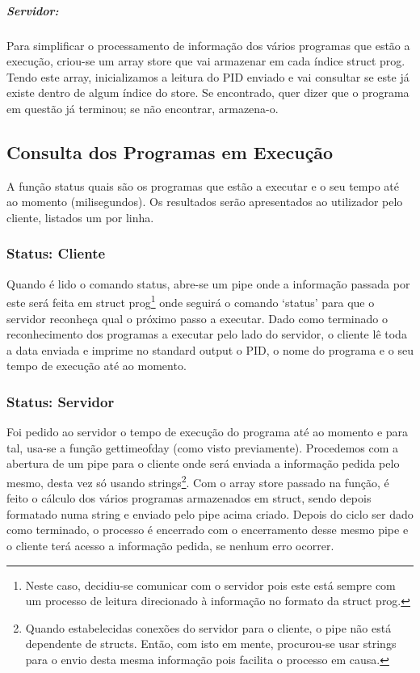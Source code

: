 \documentclass{report}
\begin{document}
\subparagraph{Servidor:}

Para simplificar o processamento de informação dos vários programas que estão a execução, criou-se um array store que vai armazenar em cada índice struct prog. Tendo este array, inicializamos a leitura do PID enviado e vai consultar se este já existe dentro de algum índice do store. Se encontrado, quer dizer que o programa em questão já terminou; se não encontrar, armazena-o. 

\subsection{Consulta dos Programas em Execução}
A função status quais são os programas que estão a executar e o seu tempo até ao momento (milisegundos). Os resultados serão apresentados ao utilizador pelo cliente, listados um por linha.

\subsubsection{Status: Cliente}

Quando é lido o comando status, abre-se um pipe onde a informação passada por este será feita em struct prog\footnote{Neste caso, decidiu-se comunicar com o servidor pois este está sempre com um processo de leitura direcionado à informação no formato da struct prog.} onde seguirá o comando ‘status’ para que o servidor reconheça qual o próximo passo a executar. Dado como terminado o reconhecimento dos programas a executar pelo lado do servidor, o cliente lê toda a data enviada e imprime no standard output o PID, o nome do programa e o seu tempo de execução até ao momento.


\subsubsection{Status: Servidor}

Foi pedido ao servidor o tempo de execução do programa até ao momento e para tal, usa-se a função gettimeofday (como visto previamente). Procedemos com a abertura de um pipe para o cliente onde será enviada a informação pedida pelo mesmo, desta vez só usando strings\footnote{Quando estabelecidas conexões do servidor para o cliente, o pipe não está dependente de structs. Então, com isto em mente, procurou-se usar strings para o envio desta mesma informação pois facilita o processo em causa.}.
Com o array store passado na função, é feito o cálculo dos vários programas armazenados em struct, sendo depois formatado numa string e enviado pelo pipe acima criado. Depois do ciclo ser dado como terminado, o processo é encerrado com o encerramento desse mesmo pipe e o cliente terá acesso a informação pedida, se nenhum erro ocorrer.\\
\end{document}
